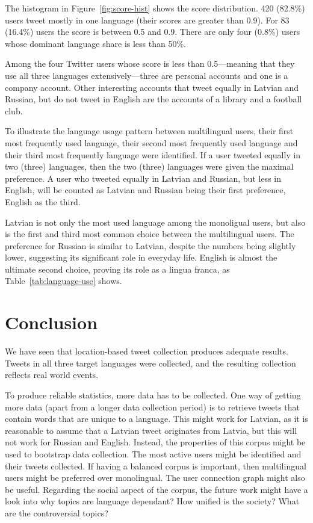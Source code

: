 \documentclass[11pt,a4paper]{article}
\begin{document}
The histogram in Figure~\ref{fig:score-hist} shows the score distribution. 420 (82.8\%) users tweet mostly in one language (their scores are greater than 0.9). For 83  (16.4\%) users the score is between 0.5 and 0.9. There are only four (0.8\%) users whose dominant language share is less than 50\%.

Among the four Twitter users whose score is less than 0.5---meaning that they use all three languages extensively---three are personal accounts and one is a company account. Other interesting accounts that tweet equally in Latvian and Russian, but do not tweet in English are the accounts of a library and a football club.

To illustrate the language usage pattern between multilingual users, their first most frequently used language, their second most frequently used language and their third most frequently language were identified. If a user tweeted equally in two (three) languages, then the two (three) languages were given the maximal preference. A user who tweeted equally in Latvian and Russian, but less in English, will be counted as Latvian and Russian being their first preference, English as the third.

Latvian is not only the most used language among the monoligual users, but also is the first and third most common choice between the multilingual users. The preference for Russian is similar to Latvian, despite the numbers being slightly lower, suggesting its significant role in everyday life. English is almost the ultimate second choice, proving its role as a lingua franca, as Table~\ref{tab:language-use} shows.



\section{Conclusion}

We have seen that location-based tweet collection produces adequate results. Tweets in all three target languages were collected, and the resulting collection reflects real world events.

To produce reliable statistics, more data has to be collected. One way of getting more data (apart from a longer data collection period) is to retrieve tweets that contain words that are unique to a language. This might work for Latvian, as it is reasonable to assume that a Latvian tweet originates from Latvia, %
but this will not work for Russian and English. Instead, the properties of this corpus might be used to bootstrap data collection. The most active users might be identified and their tweets collected. If having a balanced corpus is important, then multilingual users might be preferred over monolingual. The user connection graph might also be useful. Regarding the social aspect of the corpus, the future work might have a look into why topics are language dependant? How unified is the society? What are the controversial topics?




\balance
\end{document}
